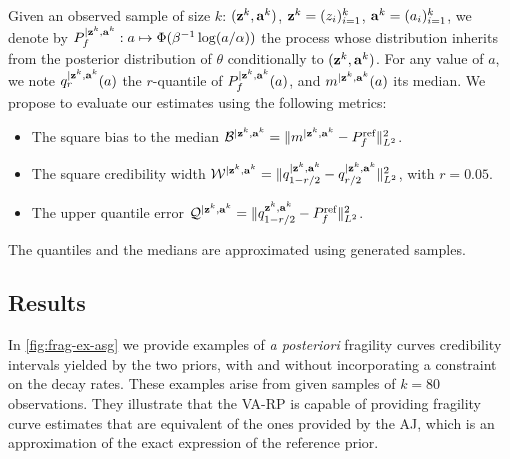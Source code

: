 Given an observed sample of size $k$: $(\mathbf{z}^k,\mathbf{a}^k)$, $\mathbf{z}^k=(z_i)_{i=1}^k$, $\mathbf{a}^k=(a_i)_{i=1}^k$, we denote by $P_f^{|\mathbf{z}^k,\mathbf{a}^k}:a\mapsto \Phi(\beta^{-1}\log (a/\alpha))$ the process whose distribution inherits from the posterior distribution  of $\theta$ conditionally to $(\mathbf{z}^k,\mathbf{a}^k)$. For any value of $a$, we note $q_{r}^{|\mathbf{z}^k,\mathbf{a}^k}(a)$ the $r$-quantile of $P^{|\mathbf{z}^k,\mathbf{a}^k}_f(a)$, and $m^{|\mathbf{z}^k,\mathbf{a}^k}(a)$ its median.
We propose to evaluate our estimates using the following metrics:
\begin{itemize}
    \item The square bias to the median $\mathcal{B}^{|\mathbf{z}^k,\mathbf{a}^k}=\|m^{|\mathbf{z}^k,\mathbf{a}^k}-P^{\text{ref}}_f\|^2_{L^2}$.
    \item The square credibility width $\mathcal{W}^{|\mathbf{z}^k,\mathbf{a}^k}=\|q_{1-r/2}^{|\mathbf{z}^k,\mathbf{a}^k} - q_{r/2}^{|\mathbf{z}^k,\mathbf{a}^k}\|^2_{L^2}$, with $r=0.05$.
    \item The upper quantile error $\mathcal{Q}^{|\mathbf{z}^k,\mathbf{a}^k}=\|q_{1-r/2}^{\mathbf{z}^k,\mathbf{a}^k}-P_f^{\text{ref}} \|^2_{L^2}$.
\end{itemize}
%
The quantiles and the medians are approximated using generated samples.









\subsection{Results}\label{sec:constr-frags:subsec:results}






In \cref{fig:frag-ex-asg} we provide examples of \emph{a posteriori} fragility curves credibility intervals yielded by the two priors, with and without incorporating a constraint on the decay rates.
These examples arise from given samples of $k=80$ observations. They illustrate that the VA-RP is capable of providing fragility curve estimates that are equivalent of the ones provided by the AJ, which is an approximation of the exact expression of the reference prior.


